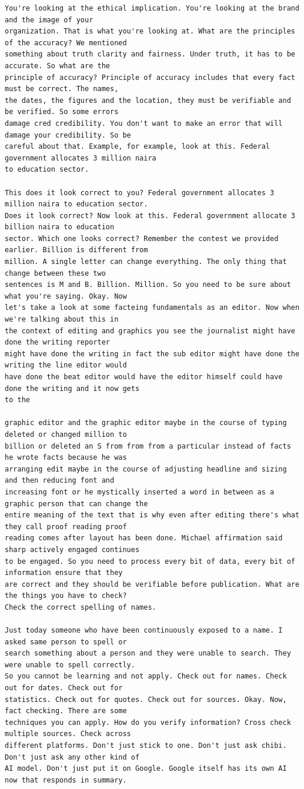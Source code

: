 {\begin{Verbatim}
You're looking at the ethical implication. You're looking at the brand and the image of your
organization. That is what you're looking at. What are the principles of the accuracy? We mentioned
something about truth clarity and fairness. Under truth, it has to be accurate. So what are the
principle of accuracy? Principle of accuracy includes that every fact must be correct. The names,
the dates, the figures and the location, they must be verifiable and be verified. So some errors
damage cred credibility. You don't want to make an error that will damage your credibility. So be
careful about that. Example, for example, look at this. Federal government allocates 3 million naira
to education sector.

This does it look correct to you? Federal government allocates 3 million naira to education sector.
Does it look correct? Now look at this. Federal government allocate 3 billion naira to education
sector. Which one looks correct? Remember the contest we provided earlier. Billion is different from
million. A single letter can change everything. The only thing that change between these two
sentences is M and B. Billion. Million. So you need to be sure about what you're saying. Okay. Now
let's take a look at some facteing fundamentals as an editor. Now when we're talking about this in
the context of editing and graphics you see the journalist might have done the writing reporter
might have done the writing in fact the sub editor might have done the writing the line editor would
have done the beat editor would have the editor himself could have done the writing and it now gets
to the

graphic editor and the graphic editor maybe in the course of typing deleted or changed million to
billion or deleted an S from from from a particular instead of facts he wrote facts because he was
arranging edit maybe in the course of adjusting headline and sizing and then reducing font and
increasing font or he mystically inserted a word in between as a graphic person that can change the
entire meaning of the text that is why even after editing there's what they call proof reading proof
reading comes after layout has been done. Michael affirmation said sharp actively engaged continues
to be engaged. So you need to process every bit of data, every bit of information ensure that they
are correct and they should be verifiable before publication. What are the things you have to check?
Check the correct spelling of names.

Just today someone who have been continuously exposed to a name. I asked same person to spell or
search something about a person and they were unable to search. They were unable to spell correctly.
So you cannot be learning and not apply. Check out for names. Check out for dates. Check out for
statistics. Check out for quotes. Check out for sources. Okay. Now, fact checking. There are some
techniques you can apply. How do you verify information? Cross check multiple sources. Check across
different platforms. Don't just stick to one. Don't just ask chibi. Don't just ask any other kind of
AI model. Don't just put it on Google. Google itself has its own AI now that responds in summary.


\end{Verbatim}}
